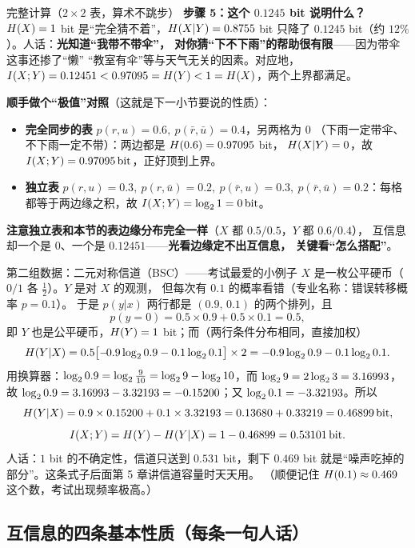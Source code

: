 \begin{calc}{完整计算（$2\times2$ 表，算术不跳步）}
\medskip
\noindent\textbf{步骤 5：这个 $0.1245$ bit 说明什么？}
$H\!\left(X\right)=1$ bit 是“完全猜不着”，$H\!\left(X|Y\right)=0.8755$ bit 只降了
$0.1245$ bit（约 $12\%$）。人话：\textbf{光知道“我带不带伞”，
对你猜“下不下雨”的帮助很有限}——因为带伞这事还掺了“懒”
“教室有伞”等与天气无关的因素。对应地，
$I\!\left(X;Y\right)=0.12451<0.97095=H\!\left(Y\right)<1=H\!\left(X\right)$，两个上界都满足。

\noindent\textbf{顺手做个“极值”对照}（这就是下一小节要说的性质）：
\begin{itemize}[leftmargin=1.4em,itemsep=1pt,topsep=1pt]
  \item \textbf{完全同步的表} $p(r,u)=0.6,\ p(\bar r,\bar u)=0.4$，另两格为 $0$
        （下雨一定带伞、不下雨一定不带）：两边都是 $H\!\left(0.6\right)=0.97095$ bit，
        $H\!\left(X|Y\right)=0$，故 $I\!\left(X;Y\right)=0.97095\,\text{bit}$，正好顶到上界。
  \item \textbf{独立表} $p(r,u)=0.3,\ p(r,\bar u)=0.2,\ p(\bar r,u)=0.3,\
        p(\bar r,\bar u)=0.2$：每格都等于两边缘之积，故 $I\!\left(X;Y\right)=\log_{2}1=0\,\text{bit}$。
\end{itemize}
\textbf{注意独立表和本节的表边缘分布完全一样}（$X$ 都 $0.5/0.5$，$Y$ 都 $0.6/0.4$），
互信息却一个是 $0$、一个是 $0.12451$——\textbf{光看边缘定不出互信息，
关键看“怎么搭配”}。
\end{calc}

\begin{calc}{第二组数据：二元对称信道（BSC）——考试最爱的小例子}
$X$ 是一枚公平硬币（$0/1$ 各 $\frac12$）。$Y$ 是对 $X$ 的观测，
但每次有 $0.1$ 的概率看错（专业名称：错误转移概率 $p=0.1$）。
于是 $p(y|x)$ 两行都是 $(0.9,\,0.1)$ 的两个排列，且
\[
p(y=0)=0.5\times0.9+0.5\times0.1=0.5,
\]
即 $Y$ 也是公平硬币，$H\!\left(Y\right)=1$ bit；而（两行条件分布相同，直接加权）
\[
H\!\left(Y|X\right)=0.5\bigl[-\!0.9\log_{2}0.9-0.1\log_{2}0.1\bigr]\times2
=-0.9\log_{2} 0.9-0.1\log_{2} 0.1 .
\]
用换算器：$\log_{2} 0.9=\log_{2}\frac{9}{10}=\log_{2} 9-\log_{2} 10$，而 $\log_{2} 9=2\log_{2} 3=3.16993$，
故 $\log_{2} 0.9=3.16993-3.32193=-0.15200$；又 $\log_{2} 0.1=-3.32193$。所以
\[
H\!\left(Y|X\right)=0.9\times0.15200+0.1\times3.32193=0.13680+0.33219=0.46899\,\text{bit} ,
\]
\[
I\!\left(X;Y\right)=H\!\left(Y\right)-H\!\left(Y|X\right)=1-0.46899=0.53101\,\text{bit} .
\]
人话：$1$ bit 的不确定性，信道只送到 $0.531$ bit，剩下 $0.469$ bit
就是“噪声吃掉的部分”。这条式子后面第 5 章讲信道容量时天天用。
（顺便记住 $H\!\left(0.1\right)\approx0.469$ 这个数，考试出现频率极高。）
\end{calc}

\subsection{互信息的四条基本性质（每条一句人话）}

